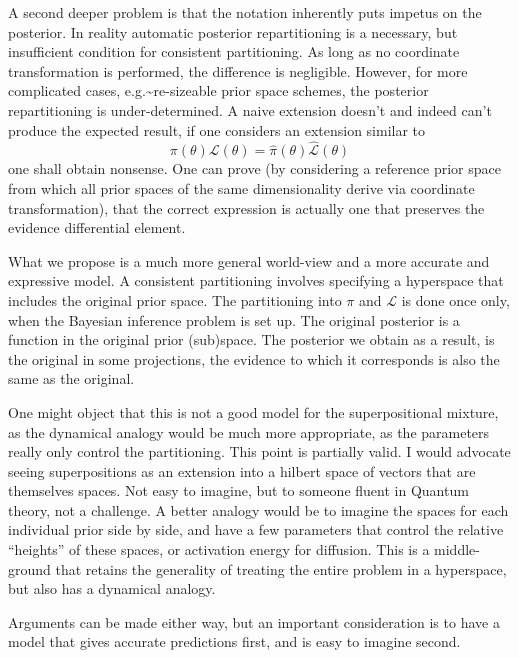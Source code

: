 \documentclass[draft,usenatbib]{mnras}
\begin{document}
A second deeper problem is that the notation inherently puts impetus
on the posterior. In reality automatic posterior repartitioning is a
necessary, but insufficient condition for consistent partitioning. As
long as no coordinate transformation is performed, the difference is
negligible. However, for more complicated cases, e.g.\textasciitilde{}re-sizeable
prior space schemes, the posterior repartitioning is
under-determined. A naive extension doesn't and indeed can't produce
the expected result, if one considers an extension similar to
\begin{equation}
  \label{eq:naive-extension}
  \pi(\theta) \mathcal{L}(\theta) = \hat{\pi}(\theta) \mathcal{\hat{L}}(\theta)
  \end{equation}
one shall obtain nonsense. One can prove (by considering a reference
prior space from which all prior spaces of the same dimensionality
derive via coordinate transformation), that the correct expression is
actually one that preserves the evidence differential element.

What we propose is a much more general world-view and a more accurate
and expressive model. A consistent partitioning involves specifying a
hyperspace that includes the original prior space. The partitioning
into \(\pi\) and \(\mathcal{L}\) is done once only, when the Bayesian
inference problem is set up. The original posterior is a function in
the original prior (sub)space. The posterior we obtain as a result, is
the original in some projections, the evidence to which it corresponds
is also the same as the original.

One might object that this is not a good model for the superpositional
mixture, as the dynamical analogy would be much more appropriate, as
the parameters really only control the partitioning. This point is
partially valid. I would advocate seeing superpositions as an
extension into a hilbert space of vectors that are themselves
spaces. Not easy to imagine, but to someone fluent in Quantum theory,
not a challenge. A better analogy would be to imagine the spaces for
each individual prior side by side, and have a few parameters that
control the relative ``heights'' of these spaces, or activation energy
for diffusion. This is a middle-ground that retains the generality of
treating the entire problem in a hyperspace, but also has a dynamical
analogy.

Arguments can be made either way, but an important consideration is to
have a model that gives accurate predictions first, and is easy to
imagine second.
\end{document}

